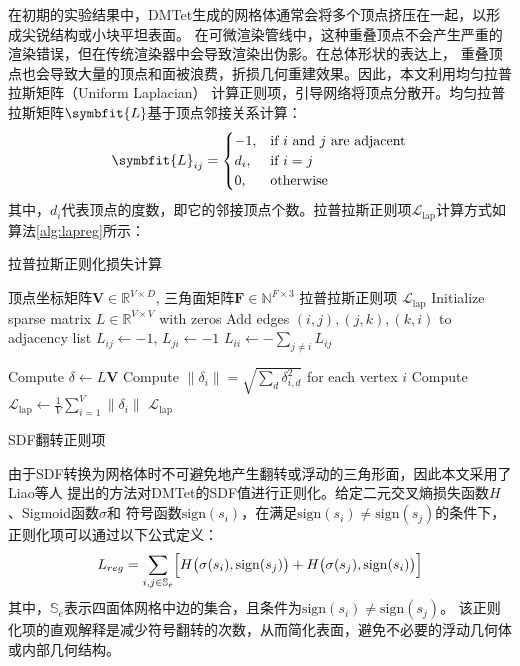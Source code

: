 在初期的实验结果中，DMTet生成的网格体通常会将多个顶点挤压在一起，以形成尖锐结构或小块平坦表面。
在可微渲染管线中，这种重叠顶点不会产生严重的渲染错误，但在传统渲染器中会导致渲染出伪影。在总体形状的表达上，
重叠顶点也会导致大量的顶点和面被浪费，折损几何重建效果。因此，本文利用均匀拉普拉斯矩阵（Uniform Laplacian）
计算正则项，引导网络将顶点分散开。均匀拉普拉斯矩阵$\symbfit{L}$基于顶点邻接关系计算：
\begin{equation}
  \symbfit{L}_{ij} =
  \begin{cases}
  -1, & \text{if } i \text{ and } j \text{ are adjacent} \\
  d_i, & \text{if } i = j \\
  0, & \text{otherwise}
  \end{cases}
  \label{eq:uniform_lap}
\end{equation}
其中，$d_i$代表顶点的度数，即它的邻接顶点个数。拉普拉斯正则项$\mathcal{L}_\text{lap}$计算方式如算法\ref{alg:lapreg}所示：
\renewcommand{\algorithmicrequire}{\textbf{输入：}\unskip}
\renewcommand{\algorithmicensure}{\textbf{输出：}\unskip}
\begin{algorithm}
  \caption{拉普拉斯正则化损失计算}
  \begin{algorithmic}[1]
  \REQUIRE 顶点坐标矩阵$\mathbf{V} \in \mathbb{R}^{V \times D}$, 三角面矩阵$\mathbf{F} \in \mathbb{N}^{F \times 3}$
  \ENSURE 拉普拉斯正则项 $\mathcal{L}_{\text{lap}}$
  \STATE Initialize sparse matrix $L \in \mathbb{R}^{V \times V}$ with zeros
      \STATE Add edges $(i, j), (j, k), (k, i)$ to adjacency list
  \ENDFOR
      \STATE $L_{ij} \gets -1$, $L_{ji} \gets -1$
  \ENDFOR
      \STATE $L_{ii} \gets -\sum_{j \neq i} L_{ij}$
  \ENDFOR

  \STATE Compute $\delta \gets L \mathbf{V}$
  \STATE Compute $\|\delta_i\| = \sqrt{\sum_{d} \delta_{i,d}^2}$ for each vertex $i$
  \STATE Compute $\mathcal{L}_{\text{lap}} \gets \frac{1}{V} \sum_{i=1}^{V} \|\delta_i\|$
  \STATE \RETURN $\mathcal{L}_{\text{lap}}$
  \end{algorithmic}
  \label{alg:lapreg}
\end{algorithm}

SDF翻转正则项

由于SDF转换为网格体时不可避免地产生翻转或浮动的三角形面，因此本文采用了Liao等人\cite{Liao_2018}
提出的方法对DMTet的SDF值进行正则化。给定二元交叉熵损失函数$H$、Sigmoid函数$\sigma$和
符号函数$\mathrm{sign}(s_i)$，在满足$\mathrm{sign}(s_i)\neq\mathrm{sign}(s_j)$的条件下，
正则化项可以通过以下公式定义：
\begin{equation}\label{eq:Lreg}
L_{reg}=\sum_{i,j\in\mathbb{S}_e}\Bigl[H\bigl(\sigma(s_i),\mathrm{sign}(s_j)\bigr)+H\bigl(\sigma(s_j),\mathrm{sign}(s_i)\bigr)\Bigr]
\end{equation}
其中，$\mathbb{S}_e$表示四面体网格中边的集合，且条件为$\mathrm{sign}(s_i)\neq\mathrm{sign}(s_j)$。
该正则化项的直观解释是减少符号翻转的次数，从而简化表面，避免不必要的浮动几何体或内部几何结构。

